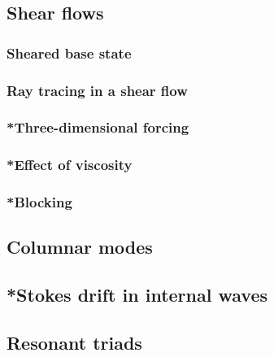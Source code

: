 \subsection{Shear flows}
\subsubsection{Sheared base state}
\subsubsection{Ray tracing in a shear flow}
\subsubsection{*Three-dimensional forcing}
\subsubsection{*Effect of viscosity}
\subsubsection{*Blocking}

\subsection{Columnar modes}
\subsection{*Stokes drift in internal waves}
\subsection{Resonant triads}